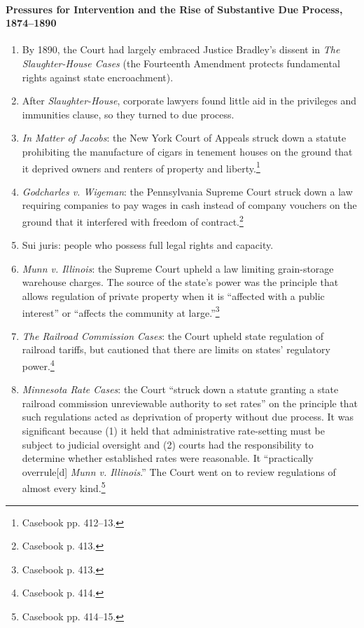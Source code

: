\paragraph{Pressures for Intervention and the Rise of Substantive Due 
Process, 1874--1890}

\begin{enumerate}
    \item By 1890, the Court had largely embraced Justice Bradley's dissent in 
    \emph{The Slaughter-House Cases} (the Fourteenth Amendment protects 
    fundamental rights against state encroachment).
    \item After \emph{Slaughter-House}, corporate lawyers found little aid in 
    the privileges and immunities clause, so they turned to due process.
    \item \emph{In Matter of Jacobs}: the New York Court of Appeals struck down a 
    statute prohibiting the manufacture of cigars in tenement houses on the 
    ground that it deprived owners and renters of property and 
    liberty.\footnote{Casebook pp. 412--13.}
    \item \emph{Godcharles v. Wigeman}: the Pennsylvania Supreme Court struck 
    down a law requiring companies to pay wages in cash instead of company 
    vouchers on the ground that it interfered with freedom of 
    contract.\footnote{Casebook p. 413.}
    \item Sui juris: people who possess full legal rights and capacity.
    \item \emph{Munn v. Illinois}: the Supreme Court upheld a law limiting 
    grain-storage warehouse charges. The source of the state's power was the 
    principle that allows regulation of private property when it is ``affected 
    with a public interest'' or ``affects the community at 
    large.''\footnote{Casebook p. 413.}
    \item \emph{The Railroad Commission Cases}: the Court upheld state 
    regulation of railroad tariffs, but cautioned that there are limits on 
    states' regulatory power.\footnote{Casebook p. 414.}
    \item \emph{Minnesota Rate Cases}: the Court ``struck down a statute 
    granting a state railroad commission unreviewable authority to set 
    rates'' on the principle that such regulations acted as deprivation of 
    property without due process. It was significant because (1) it held that 
    administrative rate-setting must be subject to judicial oversight and (2) 
    courts had the responsibility to determine whether established rates were 
    reasonable. It ``practically overrule[d] \emph{Munn v. Illinois}.'' The 
    Court went on to review regulations of almost every 
    kind.\footnote{Casebook pp. 414--15.}
\end{enumerate}

